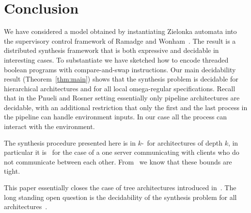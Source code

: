 \documentclass[10pt,a4paper]{article}
\begin{document}
\section{Conclusion}

We have considered a model obtained by instantiating Zielonka automata
into the supervisory control framework of Ramadge and
Wonham~\cite{RW89}. The result is a distributed synthesis framework that
is both expressive and decidable in interesting cases. To
substantiate we have sketched how to encode threaded boolean programs
with compare-and-swap instructions. Our main decidability result
(Theorem~\ref{thm:main}) shows that the synthesis problem is decidable
for hierarchical architectures and for all
local omega-regular specifications. Recall that in the Pnueli and Rosner
setting essentially only pipeline architectures are decidable, with
an additional restriction that only the first and the last process in
the pipeline can handle environment inputs. In our case all the
process can interact with the environment.

The synthesis procedure presented here is in $k$-\EXPTIME\ for
architectures of depth 
$k$, in particular it is \EXPTIME\ for the case of a one server
communicating with clients who do not communicate between each
other. From~\cite{GGMW13} we know that these bounds are tight.


This paper essentially closes the case of tree architectures
introduced in~\cite{GGMW13}. The long standing open question is the
decidability of the synthesis problem for all
architectures~\cite{GLZ04}. 
\end{document}
